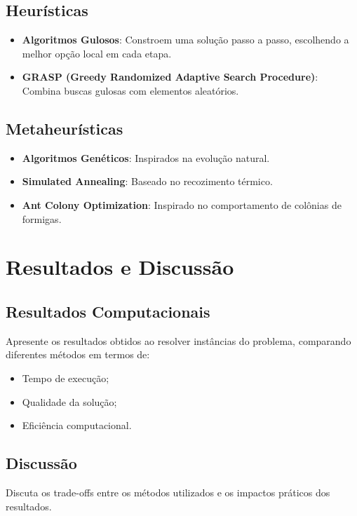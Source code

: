 \documentclass[12pt, a4paper]{report}
\begin{document}
\section{Heurísticas}
\begin{itemize}
    \item \textbf{Algoritmos Gulosos}: Constroem uma solução passo a passo, escolhendo a melhor opção local em cada etapa.
    \item \textbf{GRASP (Greedy Randomized Adaptive Search Procedure)}: Combina buscas gulosas com elementos aleatórios.
\end{itemize}

\section{Metaheurísticas}
\begin{itemize}
    \item \textbf{Algoritmos Genéticos}: Inspirados na evolução natural.
    \item \textbf{Simulated Annealing}: Baseado no recozimento térmico.
    \item \textbf{Ant Colony Optimization}: Inspirado no comportamento de colônias de formigas.
\end{itemize}

\chapter{Resultados e Discussão}

\section{Resultados Computacionais}
Apresente os resultados obtidos ao resolver instâncias do problema, comparando diferentes métodos em termos de:
\begin{itemize}
    \item Tempo de execução;
    \item Qualidade da solução;
    \item Eficiência computacional.
\end{itemize}

\section{Discussão}
Discuta os trade-offs entre os métodos utilizados e os impactos práticos dos resultados.
\end{document}
